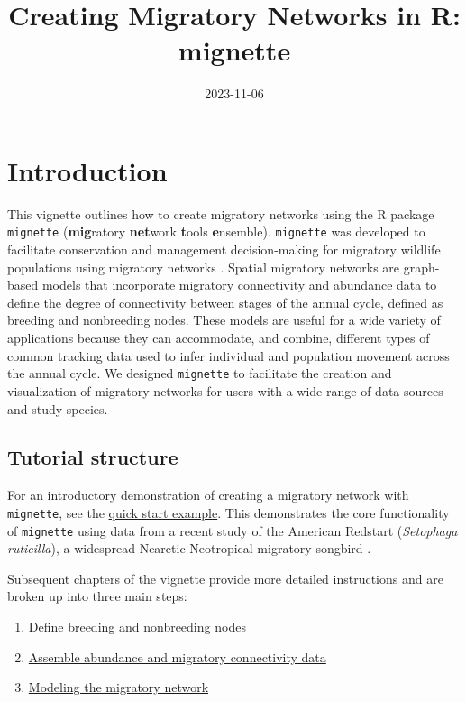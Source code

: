 \documentclass[
]{book}
\title{Creating Migratory Networks in R: mignette}
\author{}
\date{\vspace{-2.5em}2023-11-06}
\providecommand{\tightlist}{%
  \setlength{\itemsep}{0pt}\setlength{\parskip}{0pt}}
\begin{document}
\maketitle

{
\setcounter{tocdepth}{1}
\tableofcontents
}
\hypertarget{introduction}{%
\chapter{Introduction}\label{introduction}}

This vignette outlines how to create migratory networks using the R package \texttt{mignette} (\textbf{mig}ratory \textbf{net}work \textbf{t}ools \textbf{e}nsemble). \texttt{mignette} was developed to facilitate conservation and management decision-making for migratory wildlife populations using migratory networks \citep{ruegg2020genoscape, taylor2010population}. Spatial migratory networks are graph-based models that incorporate migratory connectivity and abundance data to define the degree of connectivity between stages of the annual cycle, defined as breeding and nonbreeding nodes. These models are useful for a wide variety of applications because they can accommodate, and combine, different types of common tracking data used to infer individual and population movement across the annual cycle. We designed \texttt{mignette} to facilitate the creation and visualization of migratory networks for users with a wide-range of data sources and study species.

\hypertarget{tutorial-structure}{%
\section{Tutorial structure}\label{tutorial-structure}}

For an introductory demonstration of creating a migratory network with \texttt{mignette}, see the \protect\hyperlink{quickstart}{quick start example}. This demonstrates the core functionality of \texttt{mignette} using data from a recent study of the American Redstart (\emph{Setophaga ruticilla}), a widespread Nearctic-Neotropical migratory songbird \citep{desaix2023low}.

Subsequent chapters of the vignette provide more detailed instructions and are broken up into three main steps:

\begin{enumerate}
\def\labelenumi{\arabic{enumi}.}
\tightlist
\item
  \protect\hyperlink{nodes}{Define breeding and nonbreeding nodes}
\item
  \protect\hyperlink{data}{Assemble abundance and migratory connectivity data}
\item
  \protect\hyperlink{model}{Modeling the migratory network}
\end{enumerate}
\end{document}
